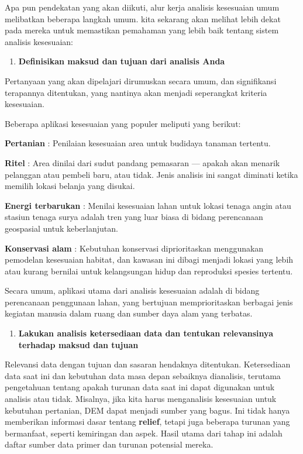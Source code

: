 \documentclass[]{book}
\providecommand{\tightlist}{%
  \setlength{\itemsep}{0pt}\setlength{\parskip}{0pt}}
\begin{document}
Apa pun pendekatan yang akan diikuti, alur kerja analisis kesesuaian umum melibatkan beberapa langkah umum. kita sekarang akan melihat lebih dekat pada mereka untuk memastikan pemahaman yang lebih baik tentang sistem analisis kesesuaian:

\begin{enumerate}
\def\labelenumi{\arabic{enumi}.}
\tightlist
\item
  \textbf{Definisikan maksud dan tujuan dari analisis Anda}
\end{enumerate}

Pertanyaan yang akan dipelajari dirumuskan secara umum, dan signifikansi terapannya ditentukan, yang nantinya akan menjadi seperangkat kriteria kesesuaian.

Beberapa aplikasi kesesuaian yang populer meliputi yang berikut:

\textbf{Pertanian} : Penilaian kesesuaian area untuk budidaya tanaman tertentu.

\textbf{Ritel} : Area dinilai dari sudut pandang pemasaran --- apakah akan menarik pelanggan atau pembeli baru, atau tidak. Jenis analisis ini sangat diminati ketika memilih lokasi belanja yang disukai.

\textbf{Energi terbarukan} : Menilai kesesuaian lahan untuk lokasi tenaga angin atau stasiun tenaga surya adalah tren yang luar biasa di bidang perencanaan geospasial untuk keberlanjutan.

\textbf{Konservasi alam} : Kebutuhan konservasi diprioritaskan menggunakan pemodelan kesesuaian habitat, dan kawasan ini dibagi menjadi lokasi yang lebih atau kurang bernilai untuk kelangsungan hidup dan reproduksi spesies tertentu.

Secara umum, aplikasi utama dari analisis kesesuaian adalah di bidang perencanaan penggunaan lahan, yang bertujuan memprioritaskan berbagai jenis kegiatan manusia dalam ruang dan sumber daya alam yang terbatas.

\begin{enumerate}
\def\labelenumi{\arabic{enumi}.}
\setcounter{enumi}{1}
\tightlist
\item
  \textbf{Lakukan analisis ketersediaan data dan tentukan relevansinya terhadap maksud dan tujuan}
\end{enumerate}

Relevansi data dengan tujuan dan sasaran hendaknya ditentukan. Ketersediaan data saat ini dan kebutuhan data masa depan sebaiknya dianalisis, terutama pengetahuan tentang apakah turunan data saat ini dapat digunakan untuk analisis atau tidak. Misalnya, jika kita harus menganalisis kesesuaian untuk kebutuhan pertanian, DEM dapat menjadi sumber yang bagus. Ini tidak hanya memberikan informasi dasar tentang \textbf{relief}, tetapi juga beberapa turunan yang bermanfaat, seperti kemiringan dan aspek. Hasil utama dari tahap ini adalah daftar sumber data primer dan turunan potensial mereka.
\end{document}
